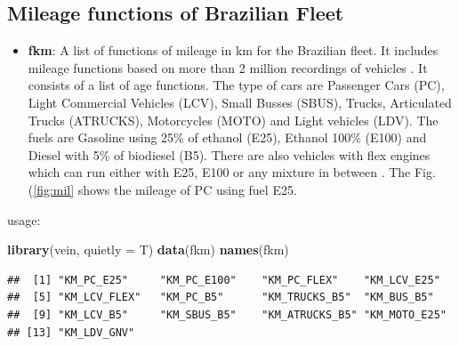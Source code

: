 \documentclass[12pt,graybox,envcountchap,sectrefs]{krantz}
\makeatletter
\newenvironment{Shaded}{\begin{snugshade}}{\end{snugshade}}
\newcommand{\KeywordTok}[1]{\textcolor[rgb]{0.13,0.29,0.53}{\textbf{#1}}}
\newcommand{\DataTypeTok}[1]{\textcolor[rgb]{0.13,0.29,0.53}{#1}}
\newcommand{\DecValTok}[1]{\textcolor[rgb]{0.00,0.00,0.81}{#1}}
\newcommand{\FloatTok}[1]{\textcolor[rgb]{0.00,0.00,0.81}{#1}}
\newcommand{\StringTok}[1]{\textcolor[rgb]{0.31,0.60,0.02}{#1}}
\newcommand{\OperatorTok}[1]{\textcolor[rgb]{0.81,0.36,0.00}{\textbf{#1}}}
\newcommand{\NormalTok}[1]{#1}
\providecommand{\tightlist}{%
  \setlength{\itemsep}{0pt}\setlength{\parskip}{0pt}}
\newenvironment{kframe}{%
\medskip{}
\setlength{\fboxsep}{.8em}
 \def\at@end@of@kframe{}%
 \ifinner\ifhmode%
  \def\at@end@of@kframe{\end{minipage}}%
  \begin{minipage}{\columnwidth}%
 \fi\fi%
 \def\FrameCommand##1{\hskip\@totalleftmargin \hskip-\fboxsep
 \colorbox{shadecolor}{##1}\hskip-\fboxsep
     \hskip-\linewidth \hskip-\@totalleftmargin \hskip\columnwidth}%
 \MakeFramed {\advance\hsize-\width
   \@totalleftmargin\z@ \linewidth\hsize
   \@setminipage}}%
 {\par\unskip\endMakeFramed%
 \at@end@of@kframe}
\renewenvironment{Shaded}{\begin{kframe}}{\end{kframe}}
\theoremstyle{definition}
\theoremstyle{definition}
\theoremstyle{definition}
\theoremstyle{remark}
\makeatother
\begin{document}
\subsection{Mileage functions of Brazilian
Fleet}\label{mileage-functions-of-brazilian-fleet}

\begin{itemize}
\tightlist
\item
  \textbf{fkm}: A list of functions of mileage in km for the Brazilian
  fleet. It includes mileage functions based on more than 2 million
  recordings of vehicles \citep{BruniBales2013}. It consists of a list
  of age functions. The type of cars are Passenger Cars (PC), Light
  Commercial Vehicles (LCV), Small Busses (SBUS), Trucks, Articulated
  Trucks (ATRUCKS), Motorcycles (MOTO) and Light vehicles (LDV). The
  fuels are Gasoline using 25\% of ethanol (E25), Ethanol 100\% (E100)
  and Diesel with 5\% of biodiesel (B5). There are also vehicles with
  flex engines which can run either with E25, E100 or any mixture in
  between \citep{2005-01-4130}. The Fig. (\ref{fig:mil} shows the
  mileage of PC using fuel E25.
\end{itemize}

usage:

\begin{Shaded}
\begin{Highlighting}[]
\KeywordTok{library}\NormalTok{(vein, }\DataTypeTok{quietly =}\NormalTok{ T)}
\KeywordTok{data}\NormalTok{(fkm)}
\KeywordTok{names}\NormalTok{(fkm)}
\end{Highlighting}
\end{Shaded}

\begin{verbatim}
##  [1] "KM_PC_E25"     "KM_PC_E100"    "KM_PC_FLEX"    "KM_LCV_E25"   
##  [5] "KM_LCV_FLEX"   "KM_PC_B5"      "KM_TRUCKS_B5"  "KM_BUS_B5"    
##  [9] "KM_LCV_B5"     "KM_SBUS_B5"    "KM_ATRUCKS_B5" "KM_MOTO_E25"  
## [13] "KM_LDV_GNV"
\end{verbatim}

\begin{Shaded}
\end{Shaded}
\end{document}
